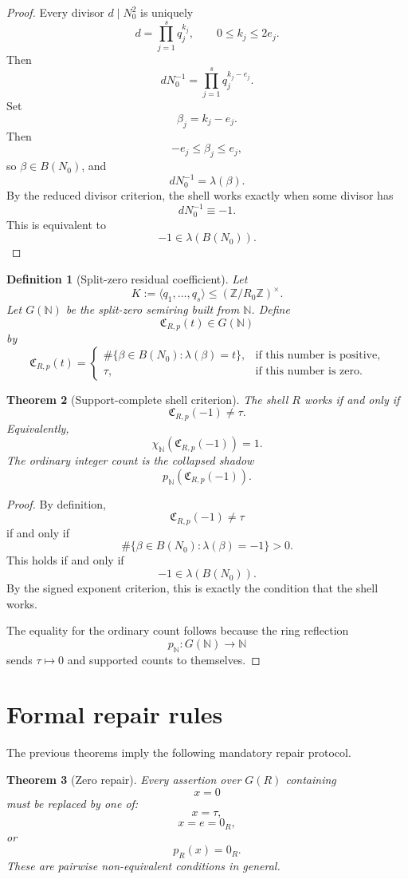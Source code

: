 \documentclass[11pt]{article}
\newtheorem{theorem}{Theorem}[section]
\newtheorem{definition}[theorem]{Definition}
\newcommand{\ZZ}{\mathbb Z}
\newcommand{\NN}{\mathbb N}
\begin{document}
\begin{proof}
Every divisor \(d\mid N_0^2\) is uniquely
\[
d=\prod_{j=1}^s q_j^{k_j},
\qquad
0\le k_j\le 2e_j.
\]
Then
\[
dN_0^{-1}
=
\prod_{j=1}^s q_j^{k_j-e_j}.
\]
Set
\[
\beta_j=k_j-e_j.
\]
Then
\[
-e_j\le \beta_j\le e_j,
\]
so \(\beta\in B(N_0)\), and
\[
dN_0^{-1}=\lambda(\beta).
\]
By the reduced divisor criterion, the shell works exactly when some divisor has
\[
dN_0^{-1}\equiv -1.
\]
This is equivalent to
\[
-1\in\lambda(B(N_0)).
\]
\end{proof}

\begin{definition}[Split-zero residual coefficient]
Let
\[
K:=\langle q_1,\dots,q_s\rangle\le(\ZZ/R_0\ZZ)^\times.
\]
Let \(G(\NN)\) be the split-zero semiring built from \(\NN\). Define
\[
\mathfrak C_{R,p}(t)\in G(\NN)
\]
by
\[
\mathfrak C_{R,p}(t)
=
\begin{cases}
\#\{\beta\in B(N_0):\lambda(\beta)=t\},&
\text{if this number is positive},\\
\tau,&
\text{if this number is zero}.
\end{cases}
\]
\end{definition}

\begin{theorem}[Support-complete shell criterion]
The shell \(R\) works if and only if
\[
\mathfrak C_{R,p}(-1)\neq\tau.
\]
Equivalently,
\[
\chi_{\NN}(\mathfrak C_{R,p}(-1))=1.
\]
The ordinary integer count is the collapsed shadow
\[
p_{\NN}(\mathfrak C_{R,p}(-1)).
\]
\end{theorem}

\begin{proof}
By definition,
\[
\mathfrak C_{R,p}(-1)\neq\tau
\]
if and only if
\[
\#\{\beta\in B(N_0):\lambda(\beta)=-1\}>0.
\]
This holds if and only if
\[
-1\in\lambda(B(N_0)).
\]
By the signed exponent criterion, this is exactly the condition that the shell works.

The equality for the ordinary count follows because the ring reflection
\[
p_{\NN}:G(\NN)\to\NN
\]
sends \(\tau\mapsto0\) and supported counts to themselves.
\end{proof}

\section{Formal repair rules}

The previous theorems imply the following mandatory repair protocol.

\begin{theorem}[Zero repair]
Every assertion over \(G(R)\) containing
\[
x=0
\]
must be replaced by one of:
\[
x=\tau,
\]
\[
x=e=0_R,
\]
or
\[
p_R(x)=0_R.
\]
These are pairwise non-equivalent conditions in general.
\end{theorem}
\end{document}
